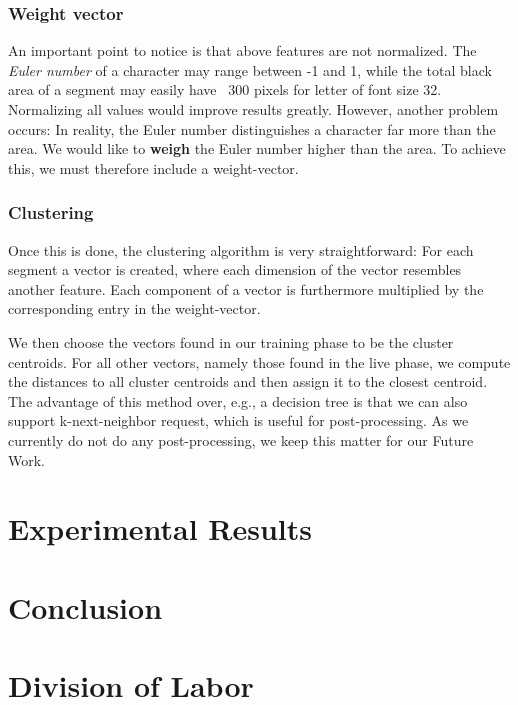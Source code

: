 \documentclass{article}
\begin{document}
\subsubsection{Weight vector}
An important point to notice is that above features are not normalized. The \textit{Euler number} of a character may range between -1 and 1, while the total black area of a segment may easily have ~300 pixels for letter of font size 32. Normalizing all values would improve results greatly. However, another problem occurs: In reality, the Euler number distinguishes a character far more than the area. We would like to \textbf{weigh} the Euler number higher than the area. To achieve this, we must therefore include a weight-vector. 

\subsubsection{Clustering}

Once this is done, the clustering algorithm is very straightforward: For each segment a vector is created, where each dimension of the vector resembles another feature. Each component of a vector is furthermore multiplied by the corresponding entry in the weight-vector. 

We then choose the vectors found in our training phase to be the cluster centroids. For all other vectors, namely those found in the live phase, we compute the distances to all cluster centroids and then assign it to the closest centroid. The advantage of this method over, e.g., a decision tree is that we can also support k-next-neighbor request, which is useful for post-processing. As we currently do not do any post-processing, we keep this matter for our Future Work.

\section{Experimental Results}

\section{Conclusion}

\section{Division of Labor}



\end{document}
